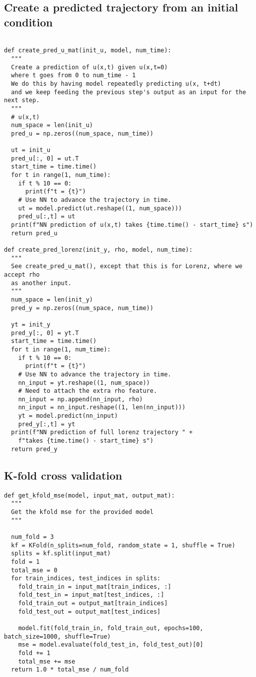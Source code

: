\documentclass[letterpaper, 10 pt, conference]{ieeeconf}  %
\begin{document}
\subsection*{Create a predicted trajectory from an initial condition}
\begin{verbatim}

def create_pred_u_mat(init_u, model, num_time):
  """
  Create a prediction of u(x,t) given u(x,t=0)
  where t goes from 0 to num_time - 1
  We do this by having model repeatedly predicting u(x, t+dt)
  and we keep feeding the previous step's output as an input for the next step.
  """
  # u(x,t)
  num_space = len(init_u)
  pred_u = np.zeros((num_space, num_time))

  ut = init_u
  pred_u[:, 0] = ut.T
  start_time = time.time()
  for t in range(1, num_time):
    if t % 10 == 0:
      print(f"t = {t}")
    # Use NN to advance the trajectory in time.
    ut = model.predict(ut.reshape((1, num_space)))
    pred_u[:,t] = ut
  print(f"NN prediction of u(x,t) takes {time.time() - start_time} s")
  return pred_u

def create_pred_lorenz(init_y, rho, model, num_time):
  """
  See create_pred_u_mat(), except that this is for Lorenz, where we accept rho
  as another input.
  """
  num_space = len(init_y)
  pred_y = np.zeros((num_space, num_time))

  yt = init_y
  pred_y[:, 0] = yt.T
  start_time = time.time()
  for t in range(1, num_time):
    if t % 10 == 0:
      print(f"t = {t}")
    # Use NN to advance the trajectory in time.
    nn_input = yt.reshape((1, num_space))
    # Need to attach the extra rho feature.
    nn_input = np.append(nn_input, rho)
    nn_input = nn_input.reshape((1, len(nn_input)))
    yt = model.predict(nn_input)
    pred_y[:,t] = yt
  print(f"NN prediction of full lorenz trajectory " +
    f"takes {time.time() - start_time} s")
  return pred_y
\end{verbatim}
\subsection*{K-fold cross validation}
\begin{verbatim}
def get_kfold_mse(model, input_mat, output_mat):
  """
  Get the kfold mse for the provided model
  """

  num_fold = 3
  kf = KFold(n_splits=num_fold, random_state = 1, shuffle = True)
  splits = kf.split(input_mat)
  fold = 1
  total_mse = 0
  for train_indices, test_indices in splits:
    fold_train_in = input_mat[train_indices, :]
    fold_test_in = input_mat[test_indices, :]
    fold_train_out = output_mat[train_indices]
    fold_test_out = output_mat[test_indices]

    model.fit(fold_train_in, fold_train_out, epochs=100, batch_size=1000, shuffle=True)
    mse = model.evaluate(fold_test_in, fold_test_out)[0]
    fold += 1
    total_mse += mse
  return 1.0 * total_mse / num_fold
\end{verbatim}
\end{document}
